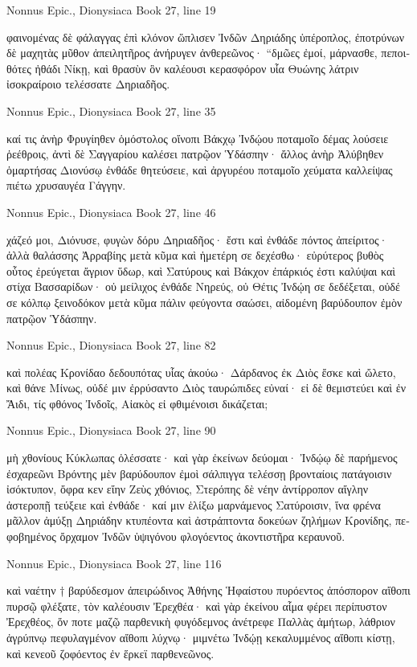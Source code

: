\documentclass[12pt,letterpaper,twoside,final]{memoir}
\begin{document}
\begin{greek}
Nonnus Epic., Dionysiaca 
Book 27, line 19

φαινομένας δὲ φάλαγγας ἐπὶ κλόνον ὥπλισεν Ἰνδῶν 
Δηριάδης ὑπέροπλος, ἐποτρύνων δὲ μαχητὰς 
μῦθον ἀπειλητῆρος ἀνήρυγεν ἀνθερεῶνος· 
 “δμῶες ἐμοί, μάρνασθε, πεποιθότες ἠθάδι Νίκῃ, 
καὶ θρασὺν ὃν καλέουσι κερασφόρον υἷα Θυώνης 
λάτριν ἰσοκραίροιο τελέσσατε Δηριαδῆος. 



Nonnus Epic., Dionysiaca 
Book 27, line 35

καί τις ἀνὴρ Φρυγίηθεν ὁμόστολος οἴνοπι Βάκχῳ 
Ἰνδῴου ποταμοῖο δέμας λούσειε ῥεέθροις, 
ἀντὶ δὲ Σαγγαρίου καλέσει πατρῷον Ὑδάσπην· 
ἄλλος ἀνὴρ Ἀλύβηθεν ὁμαρτήσας Διονύσῳ 
ἐνθάδε θητεύσειε, καὶ ἀργυρέου ποταμοῖο 
χεύματα καλλείψας πιέτω χρυσαυγέα Γάγγην. 



Nonnus Epic., Dionysiaca 
Book 27, line 46

χάζεό μοι, Διόνυσε, φυγὼν δόρυ Δηριαδῆος· 
ἔστι καὶ ἐνθάδε πόντος ἀπείριτος· ἀλλὰ θαλάσσης 
Ἀρραβίης μετὰ κῦμα καὶ ἡμετέρη σε δεχέσθω· 
εὐρύτερος βυθὸς οὗτος ἐρεύγεται ἄγριον ὕδωρ,   
καὶ Σατύρους καὶ Βάκχον ἐπάρκιός ἐστι καλύψαι 
καὶ στίχα Βασσαρίδων· οὐ μείλιχος ἐνθάδε Νηρεύς, 
οὐ Θέτις Ἰνδῴη σε δεδέξεται, οὐδέ σε κόλπῳ 
ξεινοδόκον μετὰ κῦμα πάλιν φεύγοντα σαώσει, 
αἰδομένη βαρύδουπον ἐμὸν πατρῷον Ὑδάσπην. 



Nonnus Epic., Dionysiaca 
Book 27, line 82

καὶ πολέας Κρονίδαο δεδουπότας υἷας ἀκούω· 
Δάρδανος ἐκ Διὸς ἔσκε καὶ ὤλετο, καὶ θάνε Μίνως, 
οὐδέ μιν ἐρρύσαντο Διὸς ταυρώπιδες εὐναί· 
εἰ δὲ θεμιστεύει καὶ ἐν Ἄιδι, τίς φθόνος Ἰνδοῖς, 
Αἰακὸς εἰ φθιμένοισι δικάζεται; 



Nonnus Epic., Dionysiaca 
Book 27, line 90

μὴ χθονίους Κύκλωπας ὀλέσσατε· καὶ γὰρ ἐκείνων 
δεύομαι· Ἰνδῴῳ δὲ παρήμενος ἐσχαρεῶνι   
Βρόντης μὲν βαρύδουπον ἐμοὶ σάλπιγγα τελέσσῃ 
βρονταίοις πατάγοισιν ἰσόκτυπον, ὄφρα κεν εἴην 
Ζεὺς χθόνιος, Στερόπης δὲ νέην ἀντίρροπον αἴγλην 
ἀστεροπῇ τεύξειε καὶ ἐνθάδε· καί μιν ἑλίξω 
μαρνάμενος Σατύροισιν, ἵνα φρένα μᾶλλον ἀμύξῃ 
Δηριάδην κτυπέοντα καὶ ἀστράπτοντα δοκεύων 
ζηλήμων Κρονίδης, πεφοβημένος ὄρχαμον Ἰνδῶν 
ὑψιγόνου φλογόεντος ἀκοντιστῆρα κεραυνοῦ. 



Nonnus Epic., Dionysiaca 
Book 27, line 116

καὶ ναέτην † βαρύδεσμον ἀπειρώδινος Ἀθήνης 
Ἡφαίστου πυρόεντος ἀπόσπορον αἴθοπι πυρσῷ   
φλέξατε, τὸν καλέουσιν Ἐρεχθέα· καὶ γὰρ ἐκείνου 
αἷμα φέρει περίπυστον Ἐρεχθέος, ὅν ποτε μαζῷ 
παρθενικὴ φυγόδεμνος ἀνέτρεφε Παλλὰς ἀμήτωρ, 
λάθριον ἀγρύπνῳ πεφυλαγμένον αἴθοπι λύχνῳ· 
μιμνέτω Ἰνδῴῃ κεκαλυμμένος αἴθοπι κίστῃ, 
καὶ κενεοῦ ζοφόεντος ἐν ἕρκεϊ παρθενεῶνος. 




\end{greek}
\end{document}

